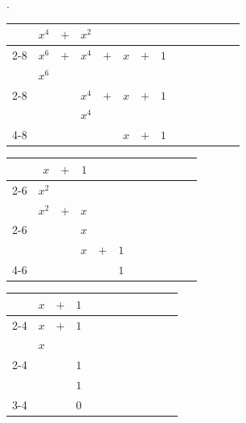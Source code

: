 \begin{eg}
\begin{center}.

\begin{tabular}{rrcrcrcrcrcrcr}
        &  $x^4$  &  $+$  &      $x^2$      \\ \cline{2-8}
 \multicolumn{1}{r|}{$x^2$}
        &  $x^6$  &  $+$  &    $x^4$  &  $+$   & $ x$  &  $+$  &  $ 1$  \\
        & $x^6$     \\ \cline{2-8}
        &              &           &     $x^4$   & $+$  & $x$   &  $+$   & $1$   \\ 
        &              &           &     $x^4$    \\ \cline{4-8}  
        &              &           &                  &          &  $ x$  &  $+$  &  $ 1$  \\
\end{tabular}
\end{center}

\begin{center}
\begin{tabular}{rrcrcrcrcrcr}
        &  $x$  &  $+$  &      $1$      \\ \cline{2-6}
 \multicolumn{1}{r|}{$x + 1$}
        &  $x^2$  \\
        & $x^2$   &  $+$  &    $x$  \\ \cline{2-6}
        &             &          &    $x$   \\
        &             &          &    $x$  & $+$ & $1$ \\ \cline{4-6}
        &             &          &           &        &  $1$
\end{tabular}
\end{center}

\begin{center}
\begin{tabular}{rrcrcrcrcrcr}
        &  $x$  &  $+$  &      $1$      \\ \cline{2-4}
 \multicolumn{1}{r|}{$1$}
        &  $x$      &   $+$ &    $1$  \\
        & $x$     \\ \cline{2-4}
        &             &          &    $1$   \\
        &             &          &    $1$ \\ \cline{3-4}
        &             &          &    $0$
\end{tabular}
\end{center}

\end{eg}

